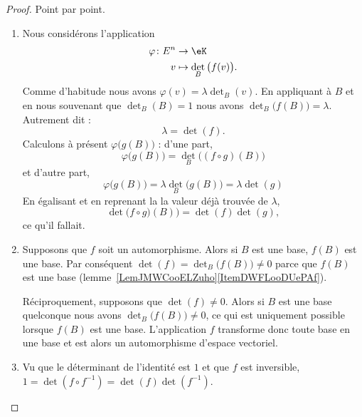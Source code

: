 \begin{proof}
	Point par point.
	\begin{enumerate}
		\item
		      Nous considérons l'application
		      \begin{equation}
			      \begin{aligned}
				      \varphi\colon E^n & \to \eK                         \\
				      v                 & \mapsto \det_B\big( f(v) \big).
			      \end{aligned}
		      \end{equation}
		      Comme d'habitude nous avons \( \varphi(v)=\lambda\det_B(v)\). En appliquant à \( B\) et en nous souvenant que \( \det_B(B)=1\) nous avons
		      $\det_B\big( f(B) \big)=\lambda$. Autrement dit :
		      \begin{equation}
			      \lambda=\det(f).
		      \end{equation}
		      Calculons à présent \( \varphi\big( g(B) \big)\) : d'une part,
		      \begin{equation}
			      \varphi\big( g(B) \big)=\det_B\big( (f\circ g)(B) \big)
		      \end{equation}
		      et d'autre part,
		      \begin{equation}
			      \varphi\big( g(B) \big)=\lambda\det_B\big( g(B) \big)=\lambda\det(g)
		      \end{equation}
		      En égalisant et en reprenant la la valeur déjà trouvée de \( \lambda\),
		      \begin{equation}
			      \det\big(f\circ g)(B) \big)=\det(f)\det(g),
		      \end{equation}
		      ce qu'il fallait.
		\item
		      Supposons que \( f\) soit un automorphisme. Alors si \( B\) est une base, \( f(B) \) est une base. Par conséquent \( \det(f)=\det_B\big( f(B) \big)\neq 0\) parce que \( f(B)\) est une base (lemme~\ref{LemJMWCooELZuho}\ref{ItemDWFLooDUePAf}).

		      Réciproquement, supposons que \( \det(f)\neq 0\). Alors si \( B\) est une base quelconque nous avons \( \det_B\big( f(B) \big)\neq 0\), ce qui est uniquement possible lorsque \( f(B)\) est une base. L'application \( f\) transforme donc toute base en une base et est alors un automorphisme d'espace vectoriel.
		\item
		      Vu que le déterminant de l'identité est \( 1\) et que \( f\) est inversible, \( 1=\det(f\circ f^{-1})=\det(f)\det(f^{-1})\).
	\end{enumerate}
\end{proof}

